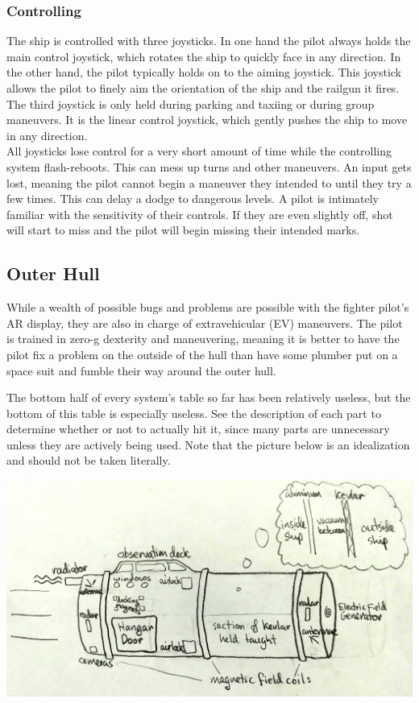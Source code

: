 \documentclass[a4paper]{article}
\begin{document}
\vspace{-0.5cm} \hspace{-18pt} \subsubsection{Controlling} \label{fighter_controlling} \vspace{-0.2cm}
The ship is controlled with three joysticks. In one hand the pilot always holds the main control joystick, which rotates the ship to quickly face in any direction. In the other hand, the pilot typically holds on to the aiming joystick. This joystick allows the pilot to finely aim the orientation of the ship and the railgun it fires. The third joystick is only held during parking and taxiing or during group maneuvers. It is the linear control joystick, which gently pushes the ship to move in any direction.
\\ \cci
{All joysticks lose control for a very short amount of time while the controlling system flash-reboots. This can mess up turns and other maneuvers.}
{An input gets lost, meaning the pilot cannot begin a maneuver they intended to until they try a few times. This can delay a dodge to dangerous levels.}
{A pilot is intimately familiar with the sensitivity of their controls. If they are even slightly off, shot will start to miss and the pilot will begin missing their intended marks.}


\newpage
\subsection{Outer Hull} \label{outer}

While a wealth of possible bugs and problems are possible with the fighter pilot's AR display, they are also in charge of extravehicular (EV) maneuvers. The pilot is trained in zero-g dexterity and maneuvering, meaning it is better to have the pilot fix a problem on the outside of the hull than have some plumber put on a space suit and fumble their way around the outer hull.

The bottom half of every system's table so far has been relatively useless, but the bottom of this table is especially useless. See the description of each part to determine whether or not to actually hit it, since many parts are unnecessary unless they are actively being used. Note that the picture below is an idealization and should not be taken literally.

\vspace{0.2cm}
\includegraphics[scale=0.3]{Outer_Hull}
\end{document}
